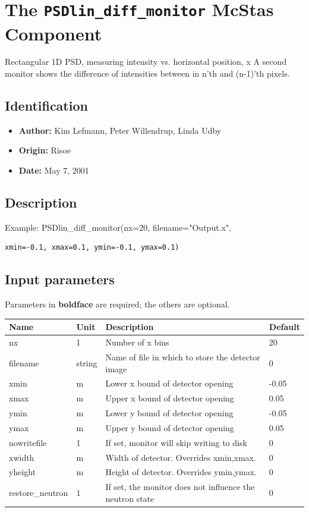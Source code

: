 \section{The \texttt{PSDlin\_diff\_monitor} McStas Component}
Rectangular 1D PSD, measuring intensity vs. horizontal position, x
A second monitor shows the difference of intensities between in n'th and (n-1)'th pixels.

\subsection*{Identification}
\begin{itemize}
  \item \textbf{Author:} Kim Lefmann, Peter Willendrup, Linda Udby
  \item \textbf{Origin:} Risoe
  \item \textbf{Date:} May 7, 2001
\end{itemize}

\subsection*{Description}
Example: PSDlin\_diff\_monitor(nx=20, filename="Output.x",

\begin{verbatim}
xmin=-0.1, xmax=0.1, ymin=-0.1, ymax=0.1)
\end{verbatim}

\subsection*{Input parameters}
Parameters in \textbf{boldface} are required; the others are optional.

\begin{longtable}{p{}p{}p{}p{}}
\toprule
\textbf{Name} & \textbf{Unit} & \textbf{Description} & \textbf{Default} \\
\midrule
\endhead
nx & 1 & Number of x bins & 20 \\
filename & string & Name of file in which to store the detector image & 0 \\
xmin & m & Lower x bound of detector opening & -0.05 \\
xmax & m & Upper x bound of detector opening & 0.05 \\
ymin & m & Lower y bound of detector opening & -0.05 \\
ymax & m & Upper y bound of detector opening & 0.05 \\
nowritefile & 1 & If set, monitor will skip writing to disk & 0 \\
xwidth & m & Width of detector. Overrides xmin,xmax. & 0 \\
yheight & m & Height of detector. Overrides ymin,ymax. & 0 \\
restore\_neutron & 1 & If set, the monitor does not influence the neutron state & 0 \\
\bottomrule
\end{longtable}

